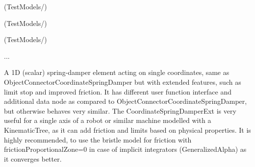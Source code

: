 \item {} (TestModels/)
\item {} (TestModels/)
\item {} (TestModels/)
\item  ...


\ei

%
\newpage


\label{sec:item:ObjectConnectorCoordinateSpringDamperExt}
A 1D (scalar) spring-damper element acting on single  coordinates, same as ObjectConnectorCoordinateSpringDamper but with extended features, such as limit stop and improved friction. It has different user function interface and additional data node as compared to ObjectConnectorCoordinateSpringDamper, but otherwise behaves very similar. The CoordinateSpringDamperExt is very useful for a single axis of a robot or similar machine modelled with a KinematicTree, as it can add friction and limits based on physical properties. It is highly recommended, to use the bristle model for friction with frictionProportionalZone=0 in case of implicit integrators (GeneralizedAlpha) as it converges better.
\vspace{12pt}\\

